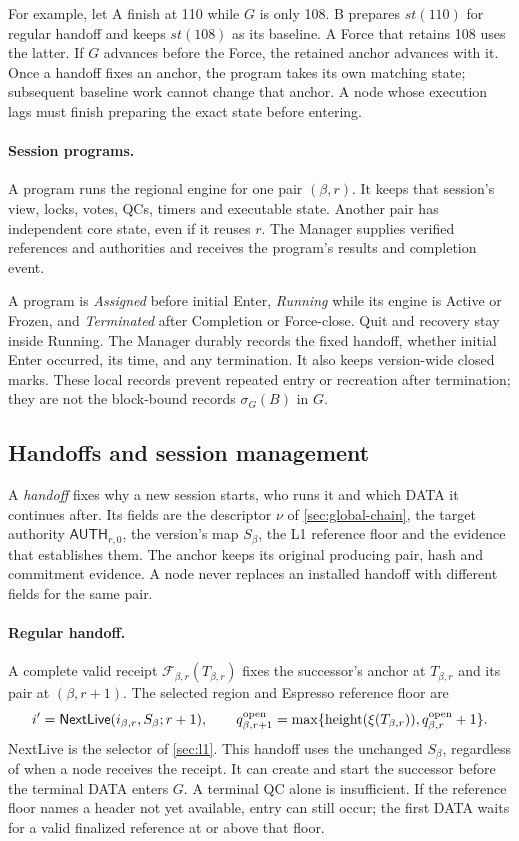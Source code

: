 \documentclass[11pt,a4paper]{article}
\newcommand{\FC}{\mathcal F}
\newcommand{\tagg}[1]{\ensuremath{\mathsf{#1}}}
\newcommand{\defterm}[1]{\textcolor{rrBlue}{\textit{#1}}}
\begin{document}
For example, let A finish at 110 while $G$ is only 108. B prepares
$\mathit{st}(110)$ for regular handoff and keeps $\mathit{st}(108)$ as
its baseline. A Force that retains 108 uses the latter. If $G$ advances
before the Force, the retained anchor advances with it. Once a handoff
fixes an anchor, the program takes its own matching state; subsequent
baseline work cannot change that anchor. A node whose execution lags
must finish preparing the exact state before entering.

\paragraph{Session programs.}
\label{sec:session-lifecycle}
A program runs the regional engine for one pair $(\beta,r)$. It keeps
that session's view, locks, votes, QCs, timers and executable state.
Another pair has independent core state, even if it reuses $r$.
The Manager supplies verified references and authorities and receives
the program's results and completion event.

A program is \defterm{Assigned} before initial Enter,
\defterm{Running} while its engine is Active or Frozen, and
\defterm{Terminated} after Completion or Force-close. Quit and recovery
stay inside Running. The Manager durably records the fixed handoff,
whether initial Enter occurred, its time, and any termination. It also
keeps version-wide closed marks. These local records prevent repeated
entry or recreation after termination; they are not the block-bound
records $\sigma_G(B)$ in $G$.

\subsection{Handoffs and session management}
\label{sec:witness}
A \defterm{handoff} fixes why a new session starts, who runs it and
which DATA it continues after. Its fields are the descriptor $\nu$ of
\cref{sec:global-chain}, the target authority $\tagg{AUTH}_{r,0}$,
the version's map $S_\beta$, the L1 reference floor and the evidence
that establishes them. The anchor keeps its original producing pair,
hash and commitment evidence. A node never replaces an installed
handoff with different fields for the same pair.

\paragraph{Regular handoff.}
A complete valid receipt $\FC_{\beta,r}(T_{\beta,r})$ fixes the
successor's anchor at $T_{\beta,r}$ and its pair at $(\beta,r+1)$.
The selected region and Espresso reference floor are
\[
 i'=\tagg{NextLive}(i_{\beta,r},S_\beta;r+1),\qquad
 q^{\rm open}_{\beta,r+1}
 =\max\{\operatorname{height}(\xi(T_{\beta,r})),
         q^{\rm open}_{\beta,r}+1\}.
\]
NextLive is the selector of \cref{sec:l1}. This handoff uses the
unchanged $S_\beta$, regardless of when a node receives the receipt.
It can create and start the successor before the terminal DATA enters
$G$. A terminal QC alone is insufficient. If the reference floor names
a header not yet available, entry can still occur; the first DATA waits
for a valid finalized reference at or above that floor.
\end{document}
